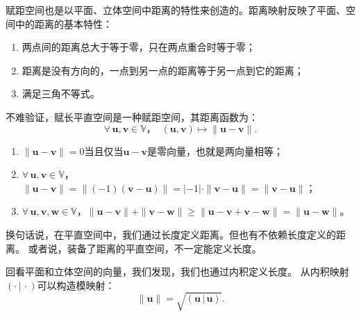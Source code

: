\documentclass[12pt,UTF8]{ctexbook}
\newcommand{\nji}[2]{\displaystyle\left( #1 \,|\, #2\right)}
\theoremstyle{definition}
\theoremstyle{plain}
\begin{document}
赋距空间也是以平面、立体空间中距离的特性来创造的。距离映射反映了平面、空间中的距离的基本特性：
\begin{enumerate}
    \item 两点间的距离总大于等于零，只在两点重合时等于零；
    \item 距离是没有方向的，一点到另一点的距离等于另一点到它的距离；
    \item 满足三角不等式。
\end{enumerate}

不难验证，赋长平直空间是一种赋距空间，其距离函数为：
$$ \forall \, \mathbf{u}, \mathbf{v} \in \mathbb{V}，\;\; (\mathbf{u}, \mathbf{v}) \mapsto \| \mathbf{u} - \mathbf{v} \|.$$
\begin{enumerate}
    \item $\| \mathbf{u} - \mathbf{v} \| = 0$当且仅当$\mathbf{u} - \mathbf{v}$是零向量，也就是两向量相等；
    \item $\forall \, \mathbf{u}, \mathbf{v} \in \mathbb{V}$，$\| \mathbf{u} - \mathbf{v} \| = \| (-1) (\mathbf{v} - \mathbf{u}) \| = |-1|\cdot \| \mathbf{v} - \mathbf{u} \| = \| \mathbf{v} - \mathbf{u} \|$；
    \item $\forall \, \mathbf{u}, \mathbf{v}, \mathbf{w} \in \mathbb{V}$，$\| \mathbf{u} - \mathbf{v} \| + \| \mathbf{v} - \mathbf{w} \| \geqslant \| \mathbf{u} - \mathbf{v} + \mathbf{v} - \mathbf{w}\| = \| \mathbf{u} - \mathbf{w} \|$。
\end{enumerate}

换句话说，在平直空间中，我们通过长度定义距离。但也有不依赖长度定义的距离。
或者说，装备了距离的平直空间，不一定能定义长度。

回看平面和立体空间的向量，我们发现，我们也通过内积定义长度。
从内积映射$\nji{\cdot}{\cdot}$可以构造模映射：
$$ \| \mathbf{u} \| = \sqrt{\nji{\mathbf{u}}{\mathbf{u}}}.$$
\end{document}
